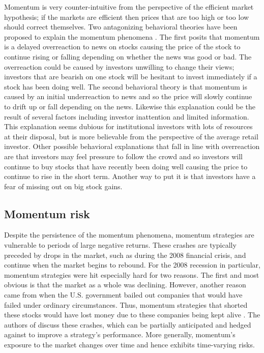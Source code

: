 \documentclass[10pt, letterpaper]{article}
\begin{document}
Momentum is very counter-intuitive from the perspective of the efficient market hypothesis; if the markets are efficient then prices that are too high or too low should correct themselves.  Two antagonizing behavioral theories have been proposed to explain the momentum phenomena \cite{Ang}.  The first posits that momentum is a delayed overreaction to news on stocks causing the price of the stock to continue rising or falling depending on whether the news was good or bad.  The overreaction could be caused by investors unwilling to change their views; investors that are bearish on one stock will be hesitant to invest immediately if a stock has been doing well.  The second behavioral theory is that momentum is caused by an initial underreaction to news and so the price will slowly continue to drift up or fall depending on the news.  Likewise this explanation could be the result of several factors including investor inattention and limited information.  This explanation seems dubious for institutional investors with lots of resources at their disposal, but is more believable from the perspective of the average retail investor.  Other possible behavioral explanations that fall in line with overreaction are that investors may feel pressure to follow the crowd and so investors will continue to buy stocks that have recently been doing well causing the price to continue to rise in the short term.  Another way to put it is that investors have a fear of missing out on big stock gains. 


\subsection{Momentum risk}

Despite the persistence of the momentum phenomena, momentum strategies are vulnerable to periods of large negative returns.  These crashes are typically preceded by drops in the market, such as during the 2008 financial crisis, and continue when the market begins to rebound.  For the 2008 recession in particular, momentum strategies were hit especially hard for two reasons.  The first and most obvious is that the market as a whole was declining.  However, another reason came from when the U.S. government bailed out companies that would have failed under ordinary circumstances.  Thus, momentum strategies that shorted these stocks would have lost money due to these companies being kept alive \cite{Ang}.  The authors of \cite{DM} discuss these crashes, which can be partially anticipated and hedged against to improve a strategy's performance.  More generally, momentum's exposure to the market changes over time and hence exhibits time-varying risks.\\
\end{document}
